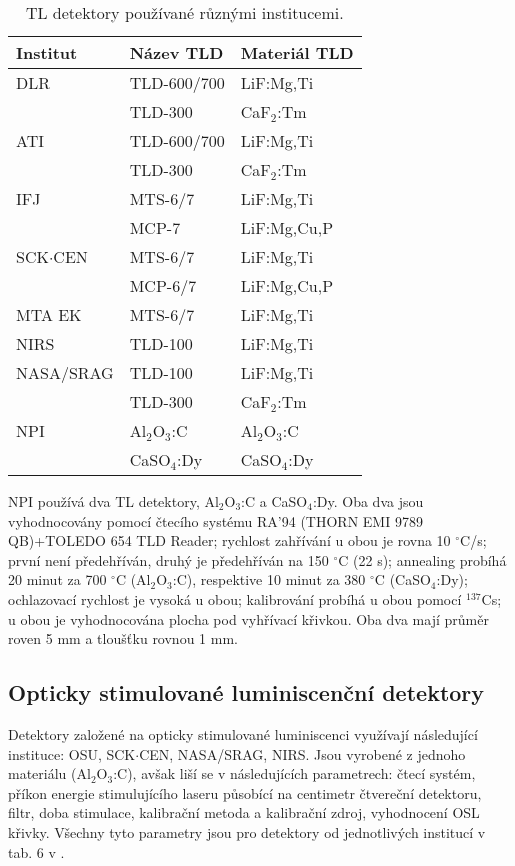\begin{table}[H]
  \def\arraystretch{0.8}
  \centering
  \caption{TL detektory používané různými institucemi. \cite{dosis}}
  \label{tab:dosis_pouzivaneTLD}
  \begin{tabular}{lll}
	\toprule
Institut&Název TLD&Materiál TLD\\
\midrule
DLR			 &TLD-600/700  &LiF:Mg,Ti\\
			 &TLD-300	   &CaF$_2$:Tm\\
ATI			 &TLD-600/700  &LiF:Mg,Ti\\
			 &TLD-300	   &CaF$_2$:Tm\\
IFJ			 &MTS-6/7	   &LiF:Mg,Ti\\
			 &MCP-7		   &LiF:Mg,Cu,P\\
SCK$\cdot$CEN&MTS-6/7	   &LiF:Mg,Ti\\
			 &MCP-6/7	   &LiF:Mg,Cu,P\\
MTA EK		 &MTS-6/7	   &LiF:Mg,Ti\\
NIRS		 &TLD-100	   &LiF:Mg,Ti\\
NASA/SRAG	 &TLD-100	   &LiF:Mg,Ti\\
			 &TLD-300	   &CaF$_2$:Tm\\
NPI			 &Al$_2$O$_3$:C&Al$_2$O$_3$:C\\
			 &CaSO$_4$:Dy  &CaSO$_4$:Dy\\
	\bottomrule
  \end{tabular}
\end{table}

NPI používá dva TL detektory, Al$_2$O$_3$:C a CaSO$_4$:Dy. Oba dva jsou vyhodnocovány pomocí čtecího systému RA’94 (THORN EMI 9789 QB)+TOLEDO 654 TLD Reader; rychlost zahřívání u obou je rovna 10 $^{\circ}$C/s; první není předehříván, druhý je předehříván na 150 $^{\circ}$C (22 s); annealing probíhá 20 minut za 700 $^{\circ}$C (Al$_2$O$_3$:C), respektive 10 minut za 380 $^{\circ}$C (CaSO$_4$:Dy); ochlazovací rychlost je vysoká u obou; kalibrování probíhá u obou pomocí $^{137}$Cs; u obou je vyhodnocována plocha pod vyhřívací křivkou. Oba dva mají průměr roven 5 mm a tloušťku rovnou 1 mm.
\subsection{Opticky stimulované luminiscenční detektory}
Detektory založené na opticky stimulované luminiscenci využívají následující instituce: OSU, SCK$\cdot$CEN, NASA/SRAG, NIRS. Jsou vyrobené z jednoho materiálu (Al$_2$O$_3$:C), avšak liší se v následujících parametrech: čtecí systém, příkon energie stimulujícího laseru působící na centimetr čtvereční detektoru, filtr, doba stimulace, kalibrační metoda a kalibrační zdroj, vyhodnocení OSL křivky. Všechny tyto parametry jsou pro detektory od jednotlivých institucí v tab. 6 v \cite{dosis}. 
